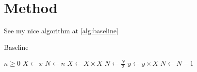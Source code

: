 \chapter{Method}\label{chp:method}


See my nice algorithm at \autoref{alg:baseline}

\begin{algorithm}
    \caption{Baseline}\label{alg:baseline}
    \begin{algorithmic}
        \Require $n \geq 0$
        \Ensure 
        \State $X \gets x$
        \State $N \gets n$
            \State $X \gets X \times X$
            \State $N \gets \frac{N}{2}$  
            \State $y \gets y \times X$
            \State $N \gets N - 1$
        \EndIf
        \EndWhile
        \end{algorithmic}
\end{algorithm}